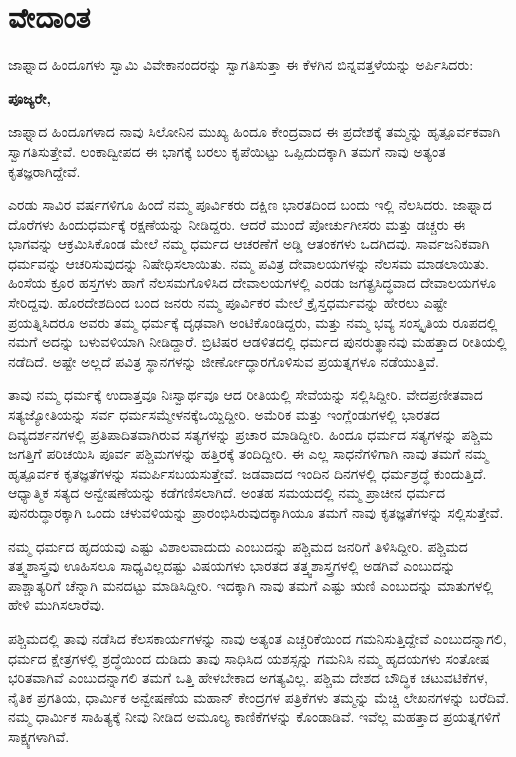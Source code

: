 
\chapter{ವೇದಾಂತ}

ಜಾಫ್ನಾದ ಹಿಂದೂಗಳು ಸ್ವಾಮಿ ವಿವೇಕಾನಂದರನ್ನು ಸ್ವಾಗತಿಸುತ್ತಾ ಈ ಕೆಳಗಿನ ಬಿನ್ನವತ್ತಳೆ\-ಯನ್ನು ಅರ್ಪಿಸಿದರು:

\textbf{ಪೂಜ್ಯರೇ,}

ಜಾಫ್ನಾದ ಹಿಂದೂಗಳಾದ ನಾವು ಸಿಲೋನಿನ ಮುಖ್ಯ ಹಿಂದೂ ಕೇಂದ್ರವಾದ ಈ ಪ್ರದೇಶಕ್ಕೆ ತಮ್ಮನ್ನು ಹೃತ್ಪೂರ್ವಕವಾಗಿ ಸ್ವಾಗತಿಸುತ್ತೇವೆ. ಲಂಕಾದ್ವೀಪದ ಈ ಭಾಗಕ್ಕೆ ಬರಲು ಕೃಪೆಯಿಟ್ಟು ಒಪ್ಪಿದುದಕ್ಕಾಗಿ ತಮಗೆ ನಾವು ಅತ್ಯಂತ ಕೃತಜ್ಞರಾಗಿದ್ದೇವೆ.

ಎರಡು ಸಾವಿರ ವರ್ಷಗಳಿಗೂ ಹಿಂದೆ ನಮ್ಮ ಪೂರ್ವಿಕರು ದಕ್ಷಿಣ ಭಾರತದಿಂದ ಬಂದು ಇಲ್ಲಿ ನೆಲಸಿದರು. ಜಾಫ್ನಾದ ದೊರೆಗಳು ಹಿಂದುಧರ್ಮಕ್ಕೆ ರಕ್ಷಣೆಯನ್ನು ನೀಡಿದ್ದರು. ಆದರೆ ಮುಂದೆ ಪೋರ್ಚುಗೀಸರು ಮತ್ತು ಡಚ್ಚರು ಈ ಭಾಗವನ್ನು ಆಕ್ರಮಿಸಿಕೊಂಡ ಮೇಲೆ ನಮ್ಮ ಧರ್ಮದ ಆಚರಣೆಗೆ ಅಡ್ಡಿ ಆತಂಕಗಳು ಒದಗಿದವು. ಸಾರ್ವಜನಿಕವಾಗಿ ಧರ್ಮವನ್ನು ಆಚರಿಸುವುದನ್ನು ನಿಷೇಧಿಸಲಾಯಿತು. ನಮ್ಮ ಪವಿತ್ರ ದೇವಾಲಯಗಳನ್ನು ನೆಲಸಮ ಮಾಡಲಾಯಿತು. ಹಿಂಸೆಯ ಕ್ರೂರ ಹಸ್ತಗಳು ಹಾಗೆ ನೆಲಸಮಗೊಳಿಸಿದ ದೇವಾಲಯಗಳಲ್ಲಿ ಎರಡು ಜಗತ್ಪ್ರಸಿದ್ಧವಾದ ದೇವಾಲಯಗಳೂ ಸೇರಿದ್ದವು. ಹೊರದೇಶದಿಂದ ಬಂದ ಜನರು ನಮ್ಮ ಪೂರ್ವಿಕರ ಮೇಲೆ ಕ್ರೈಸ್ತಧರ್ಮವನ್ನು ಹೇರಲು ಎಷ್ಟೇ ಪ್ರಯತ್ನಿಸಿದರೂ ಅವರು ತಮ್ಮ ಧರ್ಮಕ್ಕೆ ದೃಢವಾಗಿ ಅಂಟಿಕೊಂಡಿದ್ದರು, ಮತ್ತು ನಮ್ಮ ಭವ್ಯ ಸಂಸ್ಕೃತಿಯ ರೂಪದಲ್ಲಿ ನಮಗೆ ಅದನ್ನು ಬಳುವಳಿಯಾಗಿ ನೀಡಿದ್ದಾರೆ. ಬ್ರಿಟಿಷರ ಆಡಳಿತದಲ್ಲಿ ಧರ್ಮದ ಪುನರುತ್ಥಾನವು ಮಹತ್ತಾದ ರೀತಿಯಲ್ಲಿ ನಡೆದಿದೆ. ಅಷ್ಟೇ ಅಲ್ಲದೆ ಪವಿತ್ರ ಸ್ಥಾನಗಳನ್ನು ಜೀರ್ಣೋದ್ಧಾರಗೊಳಿಸುವ ಪ್ರಯತ್ನಗಳೂ ನಡೆಯುತ್ತಿವೆ.

ತಾವು ನಮ್ಮ ಧರ್ಮಕ್ಕೆ ಉದಾತ್ತವೂ ನಿಃಸ್ವಾರ್ಥವೂ ಆದ ರೀತಿಯಲ್ಲಿ ಸೇವೆಯನ್ನು ಸಲ್ಲಿಸಿದ್ದೀರಿ. ವೇದಪ್ರಣೀತವಾದ ಸತ್ಯಜ್ಯೋತಿಯನ್ನು ಸರ್ವ ಧರ್ಮಸಮ್ಮೇಳನಕ್ಕೆ\break ಒಯ್ದಿದ್ದೀರಿ. ಅಮೆರಿಕ ಮತ್ತು ಇಂಗ್ಲೆಂಡುಗಳಲ್ಲಿ ಭಾರತದ ದಿವ್ಯದರ್ಶನಗಳಲ್ಲಿ ಪ್ರತಿಪಾದಿತವಾಗಿರುವ ಸತ್ಯಗಳನ್ನು ಪ್ರಚಾರ ಮಾಡಿದ್ದೀರಿ. ಹಿಂದೂ ಧರ್ಮದ ಸತ್ಯಗಳನ್ನು ಪಶ್ಚಿಮ ಜಗತ್ತಿಗೆ ಪರಿಚಯಿಸಿ ಪೂರ್ವ ಪಶ್ಚಿಮಗಳನ್ನು ಹತ್ತಿರಕ್ಕೆ ತಂದಿದ್ದೀರಿ. ಈ ಎಲ್ಲ ಸಾಧನೆಗಳಿಗಾಗಿ ನಾವು ತಮಗೆ ನಮ್ಮ ಹೃತ್ಪೂರ್ವಕ ಕೃತಜ್ಞತೆಗಳನ್ನು ಸಮರ್ಪಿಸಬಯಸುತ್ತೇವೆ. ಜಡವಾದದ ಇಂದಿನ ದಿನಗಳಲ್ಲಿ ಧರ್ಮಶ್ರದ್ಧೆ ಕುಂದುತ್ತಿದೆ. ಆಧ್ಯಾತ್ಮಿಕ ಸತ್ಯದ ಅನ್ವೇಷಣೆಯನ್ನು ಕಡೆಗಣಿಸಲಾಗಿದೆ. ಅಂತಹ ಸಮಯದಲ್ಲಿ ನಮ್ಮ ಪ್ರಾಚೀನ ಧರ್ಮದ ಪುನರುದ್ಧಾರಕ್ಕಾಗಿ ಒಂದು ಚಳುವಳಿಯನ್ನು ಪ್ರಾರಂಭಿಸಿರುವುದಕ್ಕಾಗಿಯೂ ತಮಗೆ ನಾವು ಕೃತಜ್ಞತೆಗಳನ್ನು ಸಲ್ಲಿಸುತ್ತೇವೆ.

ನಮ್ಮ ಧರ್ಮದ ಹೃದಯವು ಎಷ್ಟು ವಿಶಾಲವಾದುದು ಎಂಬುದನ್ನು ಪಶ್ಚಿಮದ ಜನರಿಗೆ ತಿಳಿಸಿದ್ದೀರಿ. ಪಶ್ಚಿಮದ ತತ್ತ್ವಶಾಸ್ತ್ರವು ಊಹಿಸಲೂ ಸಾಧ್ಯವಿಲ್ಲದಷ್ಟು ವಿಷಯಗಳು ಭಾರತದ ತತ್ತ್ವಶಾಸ್ತ್ರಗಳಲ್ಲಿ ಅಡಗಿವೆ ಎಂಬುದನ್ನು ಪಾಶ್ಚಾತ್ಯರಿಗೆ ಚೆನ್ನಾಗಿ ಮನದಟ್ಟು ಮಾಡಿಸಿದ್ದೀರಿ. ಇದಕ್ಕಾಗಿ ನಾವು ತಮಗೆ ಎಷ್ಟು ಋಣಿ ಎಂಬುದನ್ನು ಮಾತುಗಳಲ್ಲಿ ಹೇಳಿ ಮುಗಿಸಲಾರೆವು.

ಪಶ್ಚಿಮದಲ್ಲಿ ತಾವು ನಡೆಸಿದ ಕೆಲಸಕಾರ್ಯಗಳನ್ನು ನಾವು ಅತ್ಯಂತ ಎಚ್ಚರಿಕೆಯಿಂದ ಗಮನಿಸುತ್ತಿದ್ದೇವೆ ಎಂಬುದನ್ನಾಗಲಿ, ಧರ್ಮದ ಕ್ಷೇತ್ರಗಳಲ್ಲಿ ಶ್ರದ್ಧೆಯಿಂದ ದುಡಿದು ತಾವು ಸಾಧಿಸಿದ ಯಶಸ್ಸನ್ನು ಗಮನಿಸಿ ನಮ್ಮ ಹೃದಯಗಳು ಸಂತೋಷ ಭರಿತವಾಗಿವೆ ಎಂಬು\-ದನ್ನಾಗಲಿ ತಮಗೆ ಒತ್ತಿ ಹೇಳಬೇಕಾದ ಅಗತ್ಯವಿಲ್ಲ. ಪಶ್ಚಿಮ ದೇಶದ ಬೌದ್ಧಿಕ ಚಟುವಟಿಕೆಗಳ, ನೈತಿಕ ಪ್ರಗತಿಯ, ಧಾರ್ಮಿಕ ಅನ್ವೇಷಣೆಯ ಮಹಾನ್​ ಕೇಂದ್ರಗಳ ಪತ್ರಿಕೆಗಳು ತಮ್ಮನ್ನು ಮೆಚ್ಚಿ ಲೇಖನಗಳನ್ನು ಬರೆದಿವೆ. ನಮ್ಮ ಧಾರ್ಮಿಕ ಸಾಹಿತ್ಯಕ್ಕೆ ನೀವು ನೀಡಿದ ಅಮೂಲ್ಯ ಕಾಣಿಕೆಗಳನ್ನು ಕೊಂಡಾಡಿವೆ. ಇವೆಲ್ಲ ಮಹತ್ತಾದ ಪ್ರಯತ್ನಗಳಿಗೆ ಸಾಕ್ಷ್ಯಗಳಾಗಿವೆ.

